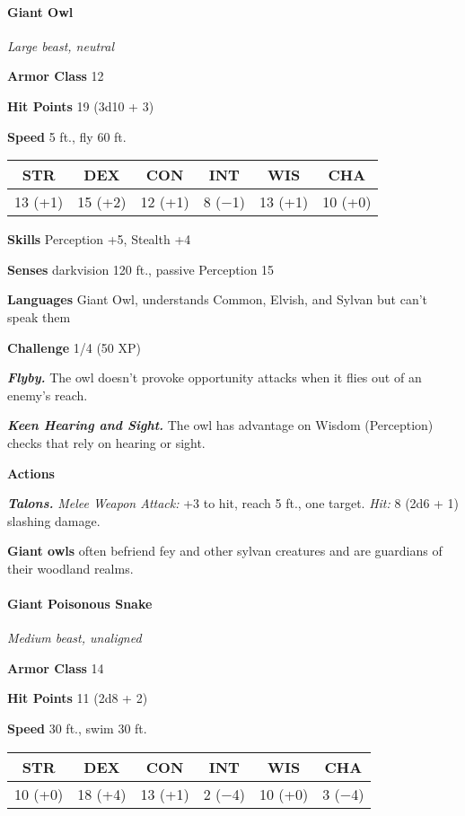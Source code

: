 \documentclass[
]{article}
\begin{document}
\hypertarget{giant-owl}{%
\paragraph{Giant Owl}\label{giant-owl}}

\emph{Large beast, neutral}

\textbf{Armor Class} 12

\textbf{Hit Points} 19 (3d10 + 3)

\textbf{Speed} 5 ft., fly 60 ft.

\begin{longtable}[]{@{}cccccc@{}}
\toprule
STR & DEX & CON & INT & WIS & CHA\tabularnewline
\midrule
\endhead
13 (+1) & 15 (+2) & 12 (+1) & 8 (−1) & 13 (+1) & 10 (+0)\tabularnewline
\bottomrule
\end{longtable}

\textbf{Skills} Perception +5, Stealth +4

\textbf{Senses} darkvision 120 ft., passive Perception 15

\textbf{Languages} Giant Owl, understands Common, Elvish, and Sylvan but
can't speak them

\textbf{Challenge} 1/4 (50 XP)

\emph{\textbf{Flyby.}} The owl doesn't provoke opportunity attacks when
it flies out of an enemy's reach.

\emph{\textbf{Keen Hearing and Sight.}} The owl has advantage on Wisdom
(Perception) checks that rely on hearing or sight.

\textbf{Actions}

\emph{\textbf{Talons.}} \emph{Melee Weapon Attack:} +3 to hit, reach 5
ft., one target. \emph{Hit:} 8 (2d6 + 1) slashing damage.

\textbf{Giant owls} often befriend fey and other sylvan creatures and
are guardians of their woodland realms.

\hypertarget{giant-poisonous-snake}{%
\paragraph{Giant Poisonous Snake}\label{giant-poisonous-snake}}

\emph{Medium beast, unaligned}

\textbf{Armor Class} 14

\textbf{Hit Points} 11 (2d8 + 2)

\textbf{Speed} 30 ft., swim 30 ft.

\begin{longtable}[]{@{}cccccc@{}}
\toprule
STR & DEX & CON & INT & WIS & CHA\tabularnewline
\midrule
\endhead
10 (+0) & 18 (+4) & 13 (+1) & 2 (−4) & 10 (+0) & 3 (−4)\tabularnewline
\bottomrule
\end{longtable}
\end{document}
